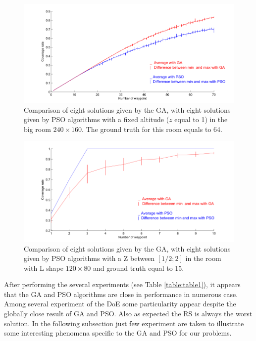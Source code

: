 \begin{figure}[!]
  \includegraphics[width=\linewidth]{img/fig8.png}
  \caption{ Comparison of eight solutions given by the GA, with eight solutions given by PSO algorithms with a fixed altitude ($z$ equal to 1) in the big room $240\times160$. The ground truth for this room equals to 64.}
  \label{fig:bigRz1}
   \endminipage\hfill
\end{figure}
%
%
\begin{figure}[!]
  \includegraphics[width=\linewidth]{img/fig9.png}
  \caption{Comparison of eight solutions given by the GA, with eight solutions given by PSO algorithms with a Z between $[1/2; 2]$ in the room with L shape $120\times80$ and ground truth equal to 15.}\label{fig:RLz2}
   \endminipage\hfill
\end{figure}
After performing the several experiments (see Table \ref{table:table1}), it appears that the GA and PSO algorithms are close in performance in numerous case. Among several experiment of the DoE some particularity appear despite the globally close result of GA and PSO. Also as expected the RS is always the worst solution.
 In the following subsection  just few experiment are taken to illustrate some interesting phenomena specific to the GA and PSO for our problems.

